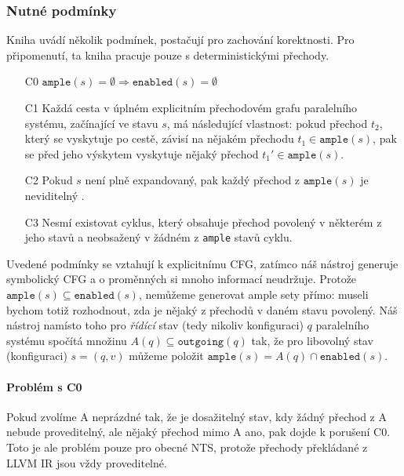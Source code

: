 \documentclass[10pt,a4paper,notitlepage]{report}
\begin{document}
\subsubsection{Nutné podmínky}
Kniha \cite{CLARKE} uvádí několik podmínek, postačují pro zachování korektnosti. Pro připomenutí, ta kniha pracuje pouze s deterministickými přechody. 

\begin{enumerate}
\item[C0] $\texttt{ample}(s) = \emptyset \Rightarrow \texttt{enabled}(s) = \emptyset$
\item[C1] Každá cesta v úplném explicitním přechodovém grafu paralelního systému, začínající ve stavu $s$, má následující vlastnost: pokud přechod $t_2$, který se vyskytuje po cestě, závisí na nějakém přechodu $t_1 \in \texttt{ample}(s)$, pak se před jeho výskytem vyskytuje nějaký přechod $t_1' \in \texttt{ample}(s)$.
\item[C2] Pokud $s$ není plně expandovaný, pak každý přechod z $\texttt{ample}(s)$ je neviditelný .
\item[C3] Nesmí existovat cyklus, který obsahuje přechod povolený v některém z jeho stavů a neobsažený v žádném z \texttt{ample} stavů cyklu.
\end{enumerate}

Uvedené podmínky se vztahují k explicitnímu CFG, zatímco náš nástroj generuje symbolický CFG a o proměnných si mnoho informací neudržuje. Protože $\texttt{ample}(s) \subseteq \texttt{enabled}(s)$, nemůžeme generovat ample sety přímo: museli bychom totiž rozhodnout, zda je nějaký z přechodů v daném stavu povolený. Náš nástroj namísto toho pro \textit{řídící} stav (tedy nikoliv konfiguraci) $q$ paralelního systému spočítá množinu $A(q) \subseteq \texttt{outgoing}(q)$ tak, že pro libovolný stav (konfiguraci) $s = (q, v)$ můžeme položit $\texttt{ample}(s) = A(q) \cap \texttt{enabled}(s)$.

\paragraph{Problém s C0}
Pokud zvolíme A neprázdné tak, že je dosažitelný stav, kdy žádný přechod z A nebude proveditelný, ale nějaký přechod mimo A ano, pak dojde k porušení C0. Toto je ale problém pouze pro obecné NTS, protože přechody překládané z LLVM IR jsou vždy proveditelné. 
\end{document}
